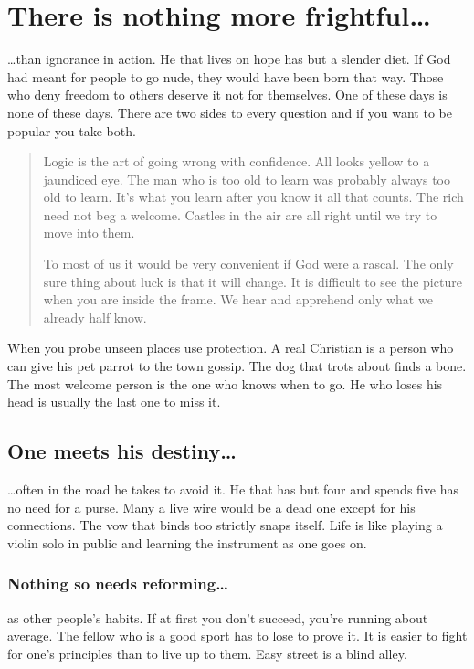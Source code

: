 \section{There is nothing more frightful\ldots}
\ldots than ignorance in action.  He that lives on hope has but a
slender diet.  If God had meant for people to go nude, they would have
been born that way.  Those who deny freedom to others deserve it not
for themselves.  One of these days is none of these days.  There are
two sides to every question and if you want to be popular you take
both.
\begin{quotation}
Logic is the art of going wrong with confidence.  All looks
yellow to a jaundiced eye.  The man who is too old to learn was
probably always too old to learn.  It's what you learn after you know
it all that counts.  The rich need not beg a welcome.  Castles in the
air are all right until we try to move into them.

To most of us it would be very convenient if God were a rascal.  The
only sure thing about luck is that it will change.  It is difficult to
see the picture when you are inside the frame.  We hear and apprehend
only what we already half know.
\end{quotation}
When you probe unseen places use protection.  A real Christian is a
person who can give his pet parrot to the town gossip.  The dog that
trots about finds a bone.  The most welcome person is the one who
knows when to go.  He who loses his head is usually the last one to
miss it.

\subsection{One meets his destiny\ldots}
\ldots often in the road he takes to avoid it.  He that has but four
and spends five has no need for a purse.  Many a live wire would be a
dead one except for his connections.  The vow that binds too strictly
snaps itself.  Life is like playing a violin solo in public and
learning the instrument as one goes on.

\subsubsection{Nothing so needs reforming\ldots}
as other people's habits.  If at first you don't succeed,
you're running about average.  The fellow who is a good sport has to
lose to prove it.  It is easier to fight for one's principles than to
live up to them.  Easy street is a blind alley.

